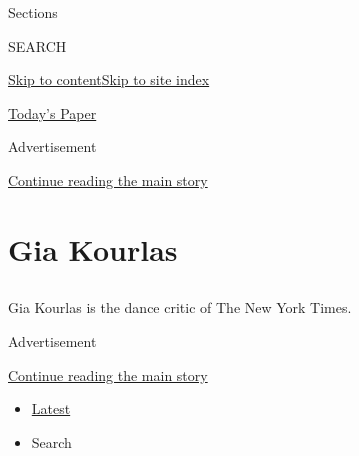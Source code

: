 Sections

SEARCH

\protect\hyperlink{site-content}{Skip to
content}\protect\hyperlink{site-index}{Skip to site index}

\href{https://myaccount.nytimes3xbfgragh.onion/auth/login?response_type=cookie\&client_id=vi}{}

\href{https://www.nytimes3xbfgragh.onion/section/todayspaper}{Today's
Paper}

Advertisement

\protect\hyperlink{after-top}{Continue reading the main story}

\hypertarget{gia-kourlas}{%
\section{Gia Kourlas}\label{gia-kourlas}}

\subsection{}

Gia Kourlas is the dance critic of The New York Times.

Advertisement

\protect\hyperlink{after-mid1}{Continue reading the main story}

\begin{itemize}
\tightlist
\item
  \protect\hyperlink{stream-panel}{Latest}
\item
  Search
\end{itemize}

